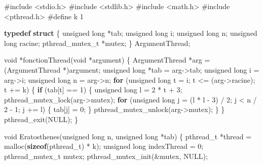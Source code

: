 \documentclass[
]{article}
\newenvironment{Shaded}{}{}
\newcommand{\ControlFlowTok}[1]{\textcolor[rgb]{0.00,0.44,0.13}{\textbf{#1}}}
\newcommand{\DataTypeTok}[1]{\textcolor[rgb]{0.56,0.13,0.00}{#1}}
\newcommand{\DecValTok}[1]{\textcolor[rgb]{0.25,0.63,0.44}{#1}}
\newcommand{\ImportTok}[1]{#1}
\newcommand{\KeywordTok}[1]{\textcolor[rgb]{0.00,0.44,0.13}{\textbf{#1}}}
\newcommand{\NormalTok}[1]{#1}
\newcommand{\PreprocessorTok}[1]{\textcolor[rgb]{0.74,0.48,0.00}{#1}}
\begin{document}
\begin{Shaded}
\begin{Highlighting}[]
\PreprocessorTok{\#include }\ImportTok{\textless{}stdio.h\textgreater{}}
\PreprocessorTok{\#include }\ImportTok{\textless{}stdlib.h\textgreater{}}
\PreprocessorTok{\#include }\ImportTok{\textless{}math.h\textgreater{}}
\PreprocessorTok{\#include }\ImportTok{\textless{}pthread.h\textgreater{}}
\PreprocessorTok{\#define k 1}

\KeywordTok{typedef} \KeywordTok{struct}
\NormalTok{\{}
    \DataTypeTok{unsigned} \DataTypeTok{long}\NormalTok{ *tab;}
    \DataTypeTok{unsigned} \DataTypeTok{long}\NormalTok{ i;}
    \DataTypeTok{unsigned} \DataTypeTok{long}\NormalTok{ n;}
    \DataTypeTok{unsigned} \DataTypeTok{long}\NormalTok{ racine;}
\NormalTok{    pthread\_mutex\_t *mutex;}
\NormalTok{\} ArgumentThread;}


\DataTypeTok{void}\NormalTok{ *fonctionThread(}\DataTypeTok{void}\NormalTok{ *argument)}
\NormalTok{\{}
\NormalTok{    ArgumentThread *arg = (ArgumentThread *)argument;}
    \DataTypeTok{unsigned} \DataTypeTok{long}\NormalTok{ *tab = arg{-}\textgreater{}tab;}
    \DataTypeTok{unsigned} \DataTypeTok{long}\NormalTok{ i = arg{-}\textgreater{}i;}
    \DataTypeTok{unsigned} \DataTypeTok{long}\NormalTok{ n = arg{-}\textgreater{}n;}
    \ControlFlowTok{for}\NormalTok{ (}\DataTypeTok{unsigned} \DataTypeTok{long}\NormalTok{ t = i; t \textless{}= (arg{-}\textgreater{}racine); t += k)}
\NormalTok{    \{}
        \ControlFlowTok{if}\NormalTok{ (tab[t] == }\DecValTok{1}\NormalTok{)}
\NormalTok{        \{}
            \DataTypeTok{unsigned} \DataTypeTok{long}\NormalTok{ l = }\DecValTok{2}\NormalTok{ * t + }\DecValTok{3}\NormalTok{;}
\NormalTok{            pthread\_mutex\_lock(arg{-}\textgreater{}mutex);}
            \ControlFlowTok{for}\NormalTok{ (}\DataTypeTok{unsigned} \DataTypeTok{long}\NormalTok{ j = (l * l {-} }\DecValTok{3}\NormalTok{) / }\DecValTok{2}\NormalTok{; j \textless{} n / }\DecValTok{2}\NormalTok{ {-} }\DecValTok{1}\NormalTok{; j += l)}
\NormalTok{            \{}
\NormalTok{                tab[j] = }\DecValTok{0}\NormalTok{;}
\NormalTok{            \}}
\NormalTok{            pthread\_mutex\_unlock(arg{-}\textgreater{}mutex);}
\NormalTok{        \}}
\NormalTok{    \}}
\NormalTok{    pthread\_exit(NULL);}
\NormalTok{\}}

\DataTypeTok{void}\NormalTok{ Eratosthenes(}\DataTypeTok{unsigned} \DataTypeTok{long}\NormalTok{ n, }\DataTypeTok{unsigned} \DataTypeTok{long}\NormalTok{ *tab)}
\NormalTok{\{}
\NormalTok{    pthread\_t *thread = malloc(}\KeywordTok{sizeof}\NormalTok{(pthread\_t) * k);}
    \DataTypeTok{unsigned} \DataTypeTok{long}\NormalTok{ indexThread = }\DecValTok{0}\NormalTok{;}
\NormalTok{    pthread\_mutex\_t mutex;}
\NormalTok{    pthread\_mutex\_init(\&mutex, NULL);}


\end{Highlighting}
\end{Shaded}
\end{document}
